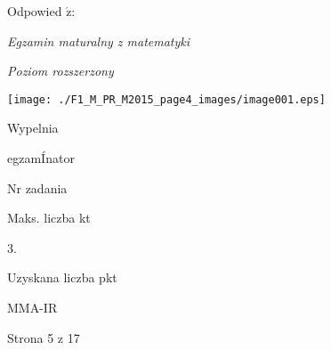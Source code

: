 \documentclass[a4paper,12pt]{article}
\begin{document}
Odpowied $\acute{\mathrm{z}}$:

{\it Egzamin maturalny z matematyki}

{\it Poziom rozszerzony}
\begin{center}
\texttt{[image: ./F1\_M\_PR\_M2015\_page4\_images/image001.eps]}
\end{center}
Wypelnia

egzamÍnator

Nr zadania

Maks. liczba kt

3.

Uzyskana liczba pkt

MMA-IR

Strona 5 z 17
\end{document}
